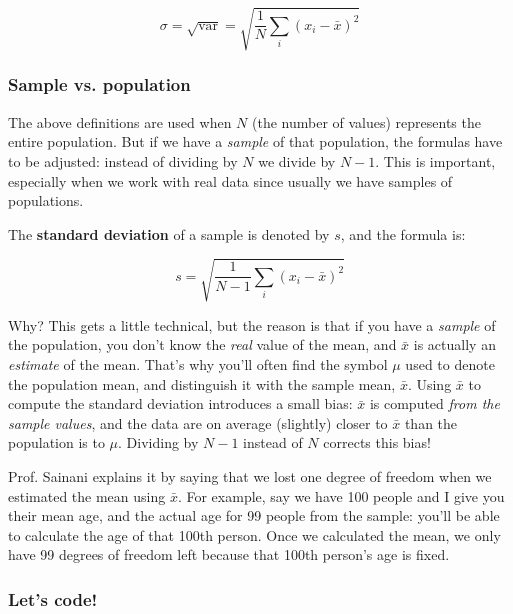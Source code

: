 \documentclass[11pt]{article}
\begin{document}
\begin{equation*} 
    \sigma = \sqrt{\text{var}} = \sqrt{\frac{1}{N}\sum_{i} (x_i - \bar{x})^2}
\end{equation*}

    \subsubsection{Sample vs. population}\label{sample-vs.-population}

The above definitions are used when \(N\) (the number of values)
represents the entire population. But if we have a \emph{sample} of that
population, the formulas have to be adjusted: instead of dividing by
\(N\) we divide by \(N-1\). This is important, especially when we work
with real data since usually we have samples of populations.

The \textbf{standard deviation} of a sample is denoted by \(s\), and the
formula is:

\begin{equation*}     
     s = \sqrt{\frac{1}{N-1}\sum_{i} (x_i - \bar{x})^2}
\end{equation*}

Why? This gets a little technical, but the reason is that if you have a
\emph{sample} of the population, you don't know the \emph{real} value of
the mean, and \(\bar{x}\) is actually an \emph{estimate} of the mean.
That's why you'll often find the symbol \(\mu\) used to denote the
population mean, and distinguish it with the sample mean, \(\bar{x}\).
Using \(\bar{x}\) to compute the standard deviation introduces a small
bias: \(\bar{x}\) is computed \emph{from the sample values}, and the
data are on average (slightly) closer to \(\bar{x}\) than the population
is to \(\mu\). Dividing by \(N-1\) instead of \(N\) corrects this bias!

Prof. Sainani explains it by saying that we lost one degree of freedom
when we estimated the mean using \(\bar{x}\). For example, say we have
100 people and I give you their mean age, and the actual age for 99
people from the sample: you'll be able to calculate the age of that
100th person. Once we calculated the mean, we only have 99 degrees of
freedom left because that 100th person's age is fixed.

    \subsubsection{Let's code!}\label{lets-code}
\end{document}
